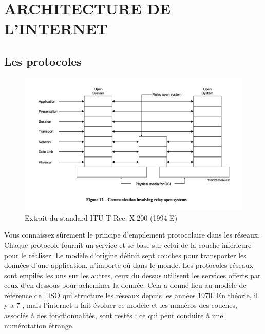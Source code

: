 
\acresetall

\cleardoublepage

\chapter{ARCHITECTURE DE L'INTERNET}

\section{Les protocoles}
  
    \vspace{1em}

  \begin{figure}
\centerline{\includegraphics[width=.6\columnwidth]{Pictures/OSI.png}}
\caption{Extrait du standard ITU-T Rec. X.200 (1994 E)}
\end{figure}

Vous connaissez sûrement le principe d'empilement protocolaire dans les réseaux. Chaque protocole fournit un service et se base sur celui de la couche inférieure pour le réaliser. Le modèle d'origine définit sept couches pour transporter les données d'une application, n'importe où dans le monde.
  Les protocoles réseaux sont empilés les uns sur les autres, ceux du dessus utilisent les services offerts par ceux d’en dessous pour acheminer la donnée. Cela a donné lieu au modèle de référence de l’\ac{ISO} qui structure les réseaux depuis les années 1970. En théorie, il y a 7 , mais l'internet a fait évoluer ce modèle et les numéros des couches, associés à des fonctionnalités, sont restés ; ce qui peut conduire à une numérotation étrange.
  
